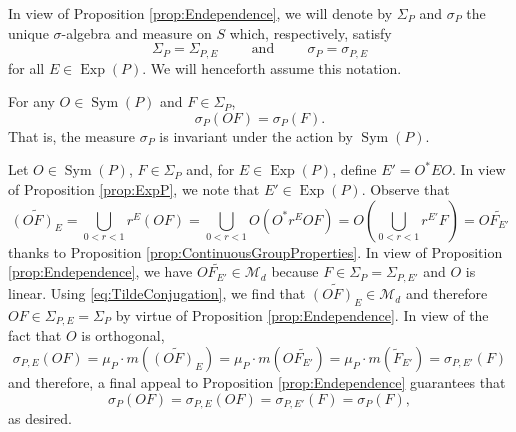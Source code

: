 \documentclass[smallextended]{svjour3}
\theoremstyle{remark}
\renewenvironment{proof}[1][\proofname]{\renewcommand\xproofname{#1}\xproof}{\endxproof}
\newcommand\Sym{\operatorname{Sym}}
\newcommand\Exp{\operatorname{Exp}}
\begin{document}
\noindent In view of Proposition \ref{prop:Endependence}, we will denote by $\Sigma_P$ and $\sigma_P$ the unique $\sigma$-algebra and measure on $S$ which, respectively, satisfy
\begin{equation*}
    \Sigma_P=\Sigma_{P,E}\hspace{1cm}\mbox{and}\hspace{1cm}\sigma_P=\sigma_{P,E}
\end{equation*}
for all $E\in\Exp(P)$. We will henceforth assume this notation. 



\begin{proposition}\label{prop:SymInvariance}
For any $O\in\Sym(P)$ and $F\in\Sigma_P$,
\begin{equation*}
\sigma_P(O F)=\sigma_P(F).
\end{equation*} 
That is, the measure $\sigma_P$ is invariant under the action by $\Sym(P)$. 
\end{proposition}



\begin{proof}
Let $O\in\Sym(P)$, $F\in\Sigma_P$ and, for $E\in \Exp(P)$, define $E'=O^* EO$. In view of Proposition \ref{prop:ExpP}, we note that $E'\in \Exp(P)$. Observe that
\begin{equation}\label{eq:TildeConjugation}
    \widetilde{(OF)_E}=\bigcup_{0<r<1}r^E (OF)=\bigcup_{0<r<1}O\left(O^* r^E O F\right)=O\left(\bigcup_{0<r<1} r^{E'}F\right)=O \widetilde{F_{E'}}
\end{equation}
thanks to Proposition \ref{prop:ContinuousGroupProperties}.
In view of Proposition \ref{prop:Endependence}, we have $O\widetilde{F_{E'}}\in \mathcal{M}_d$ because $F\in \Sigma_P=\Sigma_{P,E'}$ and $O$ is linear. Using \eqref{eq:TildeConjugation}, we find that $\widetilde{(OF)_E}\in\mathcal{M}_d$ and therefore  $OF\in\Sigma_{P,E}=\Sigma_P$ by virtue of Proposition \ref{prop:Endependence}. In view of the fact that $O$ is orthogonal,
\begin{equation*}
\sigma_{P,E}(OF)=\mu_P\cdot m\left(\widetilde{(OF)_E}\right)=\mu_P\cdot m\left(O \widetilde{F_{E'}}\right)=\mu_P\cdot m\left(\widetilde{F}_{E'}\right)=\sigma_{P,E'}(F)
\end{equation*}
and therefore, a final appeal to Proposition \ref{prop:Endependence} guarantees that
\begin{equation*}
    \sigma_P(OF)=\sigma_{P,E}(OF)=\sigma_{P,E'}(F)=\sigma_P(F),
\end{equation*}
as desired.
\end{proof}
\end{document}
